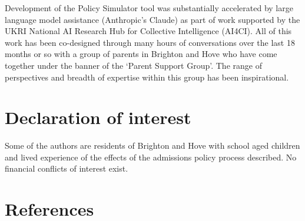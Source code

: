 \documentclass[
  12pt,
  titlepage]{article}
\begin{document}
Development of the Policy Simulator tool was substantially accelerated
by large language model assistance (Anthropic's Claude) as part of work
supported by the UKRI National AI Research Hub for Collective
Intelligence (AI4CI). All of this work has been co-designed through many
hours of conversations over the last 18 months or so with a group of
parents in Brighton and Hove who have come together under the banner of
the `Parent Support Group'. The range of perspectives and breadth of
expertise within this group has been inspirational.

\section*{Declaration of interest}\label{declaration-of-interest}

Some of the authors are residents of Brighton and Hove with school aged
children and lived experience of the effects of the admissions policy
process described. No financial conflicts of interest exist.

\section*{References}\label{references}
\end{document}
